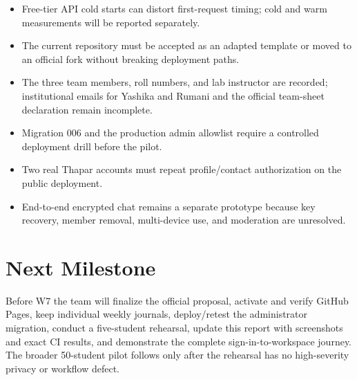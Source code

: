 \documentclass[11pt,a4paper]{article}
\begin{document}
\begin{itemize}
    \item Free-tier API cold starts can distort first-request timing; cold and warm measurements will be reported separately.
    \item The current repository must be accepted as an adapted template or moved to an official fork without breaking deployment paths.
    \item The three team members, roll numbers, and lab instructor are recorded; institutional emails for Yashika and Rumani and the official team-sheet declaration remain incomplete.
    \item Migration 006 and the production admin allowlist require a controlled deployment drill before the pilot.
    \item Two real Thapar accounts must repeat profile/contact authorization on the public deployment.
    \item End-to-end encrypted chat remains a separate prototype because key recovery, member removal, multi-device use, and moderation are unresolved.
\end{itemize}

\section{Next Milestone}

Before W7 the team will finalize the official proposal, activate and verify GitHub Pages, keep individual weekly journals, deploy/retest the administrator migration, conduct a five-student rehearsal, update this report with screenshots and exact CI results, and demonstrate the complete sign-in-to-workspace journey. The broader 50-student pilot follows only after the rehearsal has no high-severity privacy or workflow defect.
\end{document}
